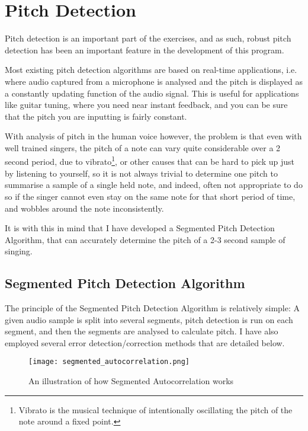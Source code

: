 \section{Pitch Detection}
\par Pitch detection is an important part of the exercises, and as such, robust pitch detection has been an important feature in the development of this program. 
\par Most existing pitch detection algorithms are based on real-time applications, i.e. where audio captured from a microphone is analysed and the pitch is displayed as a constantly updating function of the audio signal. This is useful for applications like guitar tuning, where you need near instant feedback, and you can be sure that the pitch you are inputting is fairly constant. 
\par With analysis of pitch in the human voice however, the problem is that even with well trained singers, the pitch of a note can vary quite considerable over a 2 second period, due to vibrato\footnote{Vibrato is the musical technique of intentionally oscillating the pitch of the note around a fixed point.}, or other causes that can be hard to pick up just by listening to yourself, so it is not always trivial to determine one pitch to summarise a sample of a single held note, and indeed, often not appropriate to do so if the singer cannot even stay on the same note for that short period of time, and wobbles around the note inconsistently.
\par It is with this in mind that I have developed a Segmented Pitch Detection Algorithm, that can accurately determine the pitch of a 2-3 second sample of singing.

\subsection{Segmented Pitch Detection Algorithm}
The principle of the Segmented Pitch Detection Algorithm is relatively simple: A given audio sample is split into several segments, pitch detection is run on each segment, and then the segments are analysed to calculate pitch. I have also employed several error detection/correction methods that are detailed below.
\begin{figure}
	\centering
	\texttt{[image: segmented\_autocorrelation.png]}
	\caption{An illustration of how Segmented Autocorrelation works}
\end{figure}
